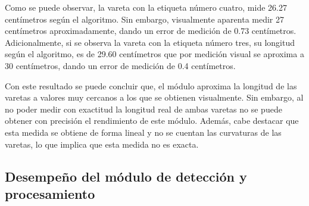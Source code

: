 Como se puede observar, la vareta con la etiqueta número cuatro, mide 26.27 centímetros según el algoritmo. Sin embargo, visualmente aparenta medir 27 centímetros aproximadamente, dando un error de medición de 0.73 centímetros. Adicionalmente, si se observa la vareta con la etiqueta número tres, su longitud según el algoritmo, es de 29.60 centímetros que por medición visual se aproxima a 30 centímetros, dando un error de medición de 0.4 centímetros. 

Con este resultado se puede concluir que, el módulo aproxima la longitud de las varetas a valores muy cercanos a los que se obtienen visualmente. Sin embargo, al no poder medir con exactitud la longitud real de ambas varetas no se puede obtener con precisión el rendimiento de este módulo. Además, cabe destacar que esta medida se obtiene de forma lineal y no se cuentan las curvaturas de las varetas, lo que implica que esta medida no es exacta.

\subsection{Desempeño del módulo de detección y procesamiento}
